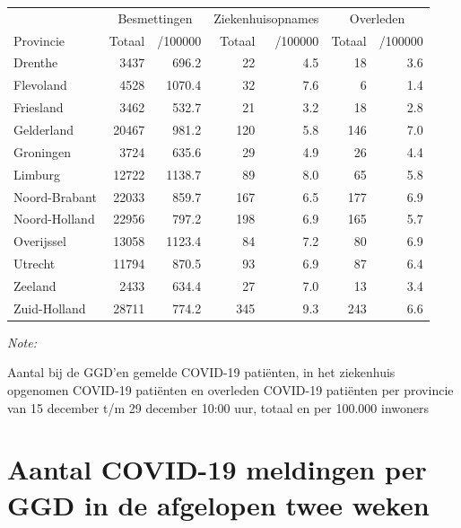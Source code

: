 \documentclass[
  english,
  man,floatsintext]{apa6}
\begin{document}
\begin{table}[H]
\centering
\begin{threeparttable}
\begin{tabular}{lrrrrrr}
\toprule
\multicolumn{1}{c}{ } & \multicolumn{2}{c}{Besmettingen} & \multicolumn{2}{c}{Ziekenhuisopnames} & \multicolumn{2}{c}{Overleden} \\
\cmidrule(l{3pt}r{3pt}){2-3} \cmidrule(l{3pt}r{3pt}){4-5} \cmidrule(l{3pt}r{3pt}){6-7}
Provincie & Totaal & /100000 & Totaal & /100000 & Totaal & /100000\\
\midrule
Drenthe & 3437 & 696.2 & 22 & 4.5 & 18 & 3.6\\
Flevoland & 4528 & 1070.4 & 32 & 7.6 & 6 & 1.4\\
Friesland & 3462 & 532.7 & 21 & 3.2 & 18 & 2.8\\
Gelderland & 20467 & 981.2 & 120 & 5.8 & 146 & 7.0\\
Groningen & 3724 & 635.6 & 29 & 4.9 & 26 & 4.4\\
Limburg & 12722 & 1138.7 & 89 & 8.0 & 65 & 5.8\\
Noord-Brabant & 22033 & 859.7 & 167 & 6.5 & 177 & 6.9\\
Noord-Holland & 22956 & 797.2 & 198 & 6.9 & 165 & 5.7\\
Overijssel & 13058 & 1123.4 & 84 & 7.2 & 80 & 6.9\\
Utrecht & 11794 & 870.5 & 93 & 6.9 & 87 & 6.4\\
Zeeland & 2433 & 634.4 & 27 & 7.0 & 13 & 3.4\\
Zuid-Holland & 28711 & 774.2 & 345 & 9.3 & 243 & 6.6\\
\bottomrule
\end{tabular}
\begin{tablenotes}
\item \textit{Note: } 
\item Aantal bij de GGD’en gemelde COVID-19 patiënten, in het ziekenhuis opgenomen COVID-19 patiënten en overleden COVID-19 patiënten per provincie van 15 december t/m 29 december 10:00 uur, totaal en per 100.000 inwoners
\end{tablenotes}
\end{threeparttable}
\end{table}

\newpage

\hypertarget{aantal-covid-19-meldingen-per-ggd-in-de-afgelopen-twee-weken}{%
\section{Aantal COVID-19 meldingen per GGD in de afgelopen twee weken}\label{aantal-covid-19-meldingen-per-ggd-in-de-afgelopen-twee-weken}}
\end{document}
